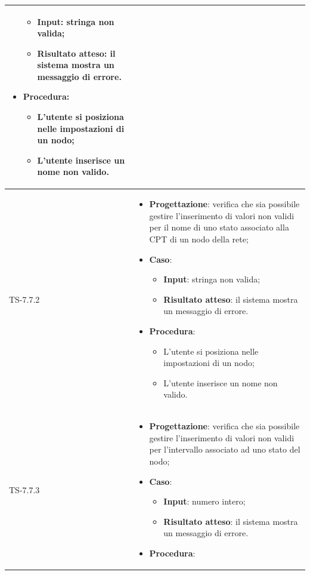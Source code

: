 \begin{longtable}{|C{2.5cm}|C{13cm}|}
\begin{itemize}
	\begin{itemize}
		\item \textbf{Input}: stringa non valida;
		\item \textbf{Risultato atteso}: il sistema mostra un messaggio di errore.
	\end{itemize}
	\item \textbf{Procedura}:
	\begin{itemize}
		\item L'utente si posiziona nelle impostazioni di un nodo;
		\item L'utente inserisce un nome non valido.
	\end{itemize} 
\end{itemize}
	 \\
	\hline
	{TS-7.7.2} & 
\begin{itemize}
	\item \textbf{Progettazione}: verifica che sia possibile gestire
	l'inserimento di valori non validi per il nome di uno stato associato alla CPT
	di un nodo della rete;
	\item \textbf{Caso}: 
	\begin{itemize}
		\item \textbf{Input}: stringa non valida;
		\item \textbf{Risultato atteso}: il sistema mostra un messaggio di errore.
	\end{itemize}
	\item \textbf{Procedura}:
	\begin{itemize}
		\item L'utente si posiziona nelle impostazioni di un nodo;
		\item L'utente inserisce un nome non valido.
	\end{itemize} 
\end{itemize}
	 \\
	\hline
	{TS-7.7.3} &
\begin{itemize}
	\item \textbf{Progettazione}: verifica che sia possibile gestire
	l'inserimento di valori non validi per l'intervallo associato ad uno stato del
	nodo;
	\item \textbf{Caso}: 
	\begin{itemize}
		\item \textbf{Input}: numero intero;
		\item \textbf{Risultato atteso}: il sistema mostra un messaggio di errore.
	\end{itemize}
	\item \textbf{Procedura}:

\end{itemize}
\end{longtable}

